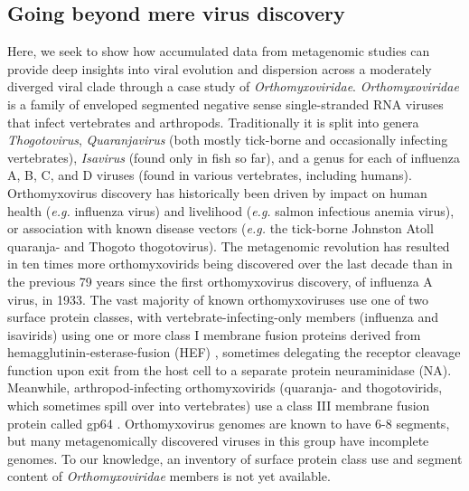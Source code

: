\documentclass[11pt]{article}
\begin{document}
\subsection{Going beyond mere virus discovery}

Here, we seek to show how accumulated data from metagenomic studies can provide deep insights into viral evolution and dispersion across a moderately diverged viral clade through a case study of \textit{Orthomyxoviridae}.
\textit{Orthomyxoviridae} is a family of enveloped segmented negative sense single-stranded RNA viruses that infect vertebrates and arthropods.
Traditionally it is split into genera \textit{Thogotovirus}, \textit{Quaranjavirus} (both mostly tick-borne and occasionally infecting vertebrates), \textit{Isavirus} (found only in fish so far), and a genus for each of influenza A, B, C, and D viruses (found in various vertebrates, including humans).
Orthomyxovirus discovery has historically been driven by impact on human health (\textit{e.g.} influenza virus) and livelihood (\textit{e.g.} salmon infectious anemia virus), or association with known disease vectors (\textit{e.g.} the tick-borne Johnston Atoll quaranja- and Thogoto thogotovirus).
The metagenomic revolution has resulted in ten times more orthomyxovirids being discovered over the last decade than in the previous 79 years since the first orthomyxovirus discovery, of influenza A virus, in 1933.
The vast majority of known orthomyxoviruses use one of two surface protein classes, with vertebrate-infecting-only members (influenza and isavirids) using one or more class I membrane fusion proteins derived from hemagglutinin-esterase-fusion (HEF) \citep{parry_divergent_2020}, sometimes delegating the receptor cleavage function upon exit from the host cell to a separate protein neuraminidase (NA).
Meanwhile, arthropod-infecting orthomyxovirids (quaranja- and thogotovirids, which sometimes spill over into vertebrates) use a class III membrane fusion protein called gp64 \citep{garry_proteomics_2008}.
Orthomyxovirus genomes are known to have 6-8 segments, but many metagenomically discovered viruses in this group have incomplete genomes.
To our knowledge, an inventory of surface protein class use and segment content of \textit{Orthomyxoviridae} members is not yet available.
\end{document}
